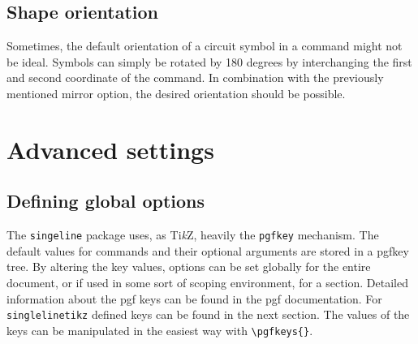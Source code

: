 \documentclass[a4]{article}
\newcommand*\Tikz{\textup{Ti\textit kZ}\xspace}
\begin{document}
\subsection{Shape orientation}
Sometimes, the default orientation of a circuit symbol in a command might not be ideal. Symbols can simply be rotated by 180 degrees by interchanging the first and second coordinate of the command. In combination with the previously mentioned mirror option, the desired orientation should be possible.
\begin{examplebox}
\end{examplebox}
\section{Advanced settings }
\subsection{Defining global options}
The \verb+singeline+ package uses, as \Tikz, heavily the \verb+pgfkey+ mechanism. The default values for commands and their optional arguments are stored in a pgfkey tree. By altering the key values, options can be set globally for the entire document, or if used in some sort of scoping environment, for a section. Detailed information about the pgf keys can be found in the pgf documentation. 
For \verb+singlelinetikz+ defined keys can be found in the next section. The values of the keys can be manipulated in the easiest way with \verb+\pgfkeys{}+.
\end{document}
